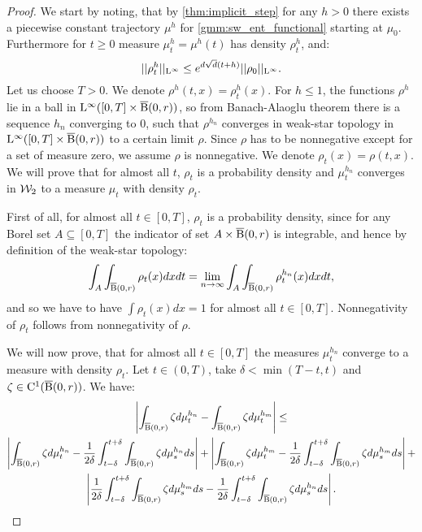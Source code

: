 \begin{proof}
We start by noting, that by \ref{thm:implicit_step} for any $h > 0$ there exists a piecewise constant trajectory $\mu^h$ for \ref{gmm:sw_ent_functional} starting at $\mu_0$. Furthermore for $t \geq 0$ measure $\mu_t^h = \mu^h(t)$ has density $\rho_t^h$, and:
\begin{equation} \label{ineq:dens_bound}
||\rho_t^h||_{\mathrm{L}^{\infty}} \leq e^{d \sqrt{d} (t+ h)} ||\rho_0||_{\mathrm{L}^{\infty}}.
\end{equation}
Let us choose $T > 0$. We denote $\rho^h(t,x) = \rho_t^h(x)$. 
For $ h \leq 1$, the functions $\rho^h$ lie in a ball in $\mathrm{L}^{\infty}([0,T] \times \operatorname{\overline{B}}(0,r))$, so from Banach-Alaoglu theorem there is a sequence $h_n$ converging to $0$, such that $\rho^{h_n}$ converges in weak-star topology in $\mathrm{L}^{\infty}([0,T] \times \operatorname{\overline{B}}(0,r))$ to a certain limit $\rho$. Since $\rho$ has to be nonnegative except for a set of measure zero, we assume $\rho$ is nonnegative. We denote $\rho_t(x) = \rho(t,x)$. We will prove that for almost all $t$, $\rho_t$ is a probability density and $\mu_{t}^{h_n}$ converges in ${\cal W}_2$ to a measure $\mu_t$ with density $\rho_t$.

First of all, for almost all $t \in [0,T]$, $\rho_t$ is a probability density, since for any Borel set $A \subseteq [0,T]$ the indicator of set $A \times \operatorname{\overline{B}}(0,r)$ is integrable, and hence by definition of the weak-star topology:
\[
\int_A \int_{\operatorname{\overline{B}}(0,r)} \rho_t(x) dx dt = \lim_{n \rightarrow \infty} \int_A \int_{\operatorname{\overline{B}}(0,r)} \rho_t^{h_n}(x) dx dt,
\]
and so we have to have $\int \rho_t(x) dx = 1$ for almost all $t \in [0,T]$. Nonnegativity of $\rho_t$ follows from nonnegativity of $\rho$. 

We will now prove, that for almost all $t \in [0,T]$ the measures $\mu_t^{h_n}$ converge to a measure with density $\rho_t$. Let $t \in (0,T)$, take $\delta < \min(T-t, t)$ and $\zeta \in \mathrm{C}^1(\operatorname{\overline{B}}(0,r))$. We have:
\begin{multline} \label{ineq:mu_t_conv_bound}
\left| \int_{\operatorname{\overline{B}}(0,r)} \zeta d\mu_t^{h_n} - \int_{\operatorname{\overline{B}}(0,r)} \zeta d\mu_t^{h_m} \right| \leq \\ \left| \int_{\operatorname{\overline{B}}(0,r)} \zeta d\mu_t^{h_n} - \frac{1}{2\delta} \int_{t - \delta}^{t + \delta} \int_{\operatorname{\overline{B}}(0,r)} \zeta d\mu_s^{h_n} ds \right| + 
\left| \int_{\operatorname{\overline{B}}(0,r)} \zeta d\mu_t^{h_m} - \frac{1}{2\delta} \int_{t - \delta}^{t + \delta} \int_{\operatorname{\overline{B}}(0,r)} \zeta d\mu_s^{h_m} ds \right| +  \\
\left| \frac{1}{2\delta} \int_{t - \delta}^{t + \delta} \int_{\operatorname{\overline{B}}(0,r)} \zeta d\mu_s^{h_m} ds - \frac{1}{2\delta} \int_{t - \delta}^{t + \delta} \int_{\operatorname{\overline{B}}(0,r)} \zeta d\mu_s^{h_n} ds \right|.
\end{multline}


\end{proof}
